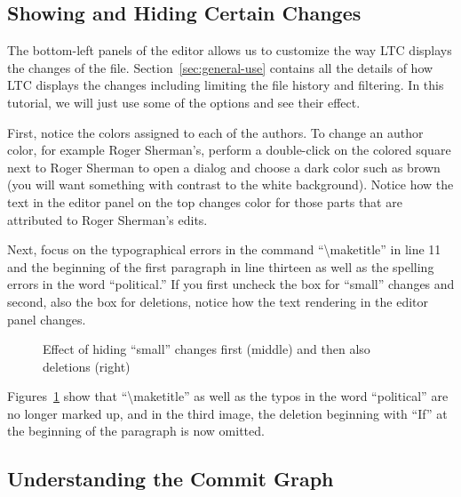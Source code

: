 \subsection{Showing and Hiding Certain Changes}

The bottom-left panels of the editor allows us to customize the way LTC displays the changes of the file.  Section~\ref{sec:general-use} contains all the details of how LTC displays the changes including limiting the file history and filtering.  In this tutorial, we will just use some of the options and see their effect.

First, notice the colors assigned to each of the authors.  To change an author color, for example Roger Sherman's,  perform a double-click on the colored square next to Roger Sherman to open a dialog and  choose a dark color such as brown (you will want something with contrast to the white background).  Notice how the text in the editor panel on the top changes color for those parts that are attributed to Roger Sherman's edits.

Next, focus on the typographical errors in the command ``\textbackslash maketitle'' in line 11 and the beginning of the first paragraph in line thirteen as well as the spelling errors in the word ``political.''  If you first uncheck the box for ``small'' changes and second, also the box for deletions, notice how the text rendering in the editor panel changes.
\begin{figure}[t]
  \centering
  \hspace{2em}
  \hspace{2em}
\caption{Effect of hiding ``small'' changes first (middle) and then also deletions (right)} \label{fig:editor-filter-small}
\end{figure}
Figures~\ref{fig:editor-filter-small} show that ``\textbackslash maketitle'' as well as the typos in the word ``political'' are no longer marked up, and in the third image, the deletion beginning with ``If'' at the beginning of the paragraph is now omitted.

\subsection{Understanding the Commit Graph}

